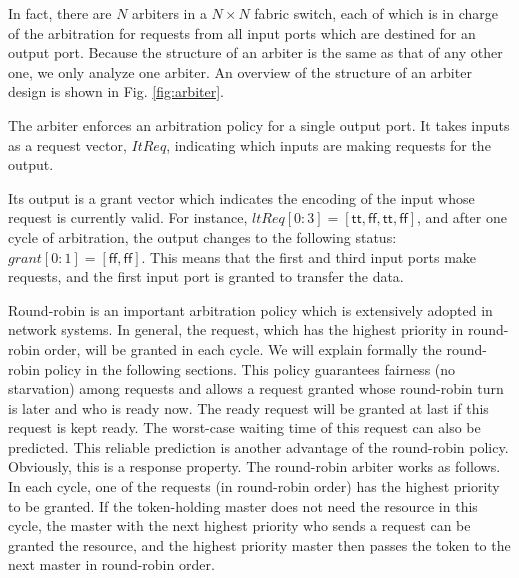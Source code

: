 \documentclass[final]{IEEEtran}
\begin{document}
In fact, there are $N$ arbiters in a $N \times N$ fabric switch,
each of which is in charge of the arbitration for requests from all
input ports which are destined for an output port. Because the
structure of an arbiter is the same as that of any other one,  we
only analyze one arbiter. An overview of the structure of an
arbiter design is shown in Fig. \ref{fig:arbiter}.

The arbiter enforces an arbitration policy for a single output port.
It takes inputs as a request vector, $ItReq$, indicating which inputs
are making requests for the output. %

Its output is a grant vector which indicates the encoding of the
input whose request is currently valid. %
For instance,
$ltReq[0:3]=[\mathsf{tt},\mathsf{ff},\mathsf{tt},\mathsf{ff}]$, and after
one cycle of arbitration, the output changes to the following
status: %
$grant[0:1]=[\mathsf{ff},\mathsf{ff}]$. This means that the first and
third input ports  make requests, and the first input port is
granted to transfer the data.

Round-robin is an important arbitration policy which is extensively
adopted in network systems. In general, the request, which has the
highest priority in round-robin order, will be granted in each
cycle.  We will explain formally the round-robin policy in the following
sections. This policy guarantees fairness (no starvation) among
requests and allows a request granted whose round-robin turn is
later and who is ready now. The ready request will be granted at
last if this request is kept ready.  The worst-case waiting time of
this
request can also be predicted. %
This reliable prediction is another advantage of the round-robin policy. %
 Obviously, this is a response property. %
The round-robin arbiter works as follows. In
each cycle, one of the requests (in round-robin order) has the
highest priority to be granted. If the token-holding master does not
need the resource in this cycle, the master with the next highest
priority who sends a request can be granted the resource, and the
highest priority master then passes the token to the next master in
round-robin order.
\end{document}
